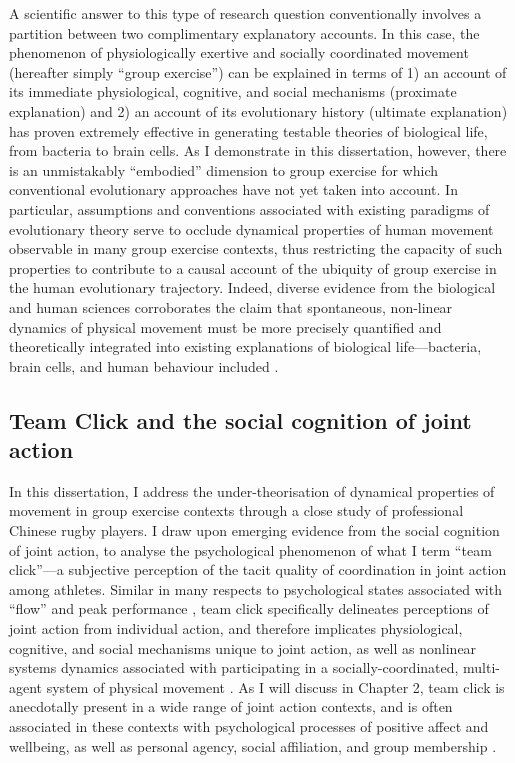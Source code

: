 A scientific answer to this type of research question conventionally involves a partition between two complimentary explanatory accounts.  In this case, the phenomenon of physiologically exertive and socially coordinated movement (hereafter simply ``group exercise'') can be explained in terms of 1) an account of its immediate physiological, cognitive, and social mechanisms (proximate explanation) and 2) an account of its evolutionary history (ultimate explanation) has proven extremely effective in generating testable theories of biological life, from bacteria to brain cells.
As I demonstrate in this dissertation, however, there is an unmistakably ``embodied'' dimension to group exercise for which conventional evolutionary approaches have not yet taken into account. In particular, assumptions and conventions associated with existing paradigms of evolutionary theory serve to occlude dynamical properties of human movement observable in many group exercise contexts, thus restricting the capacity of such properties to contribute to a causal account of the ubiquity of group exercise in the human evolutionary trajectory.  Indeed, diverse evidence from the biological and human sciences corroborates the claim that spontaneous, non-linear dynamics of physical movement must be more precisely quantified and theoretically integrated into existing explanations of biological life---bacteria, brain cells, and human behaviour included \citep{Nowak2006,Kelso2016,Laland2011,Laland2015,Yufik2017a,Nowak2017}.

\subsection{Team Click and the social cognition of joint action}
In this dissertation, I address the under-theorisation of dynamical properties of movement in group exercise contexts through a close study of professional Chinese rugby players.  I draw upon emerging evidence from the social cognition of joint action, to analyse the psychological phenomenon of what I term ``team click''---a subjective perception of the tacit quality of coordination in joint action among athletes.  Similar in many respects to psychological states associated with ``flow'' and peak performance \citep{Csikszentmihalyi1992}, team click specifically delineates perceptions of joint action from individual action, and therefore implicates physiological, cognitive, and social mechanisms unique to joint action, as well as nonlinear systems dynamics associated with participating in a socially-coordinated, multi-agent system of physical movement \citep{Kelso2009}. As I will discuss in Chapter 2, team click is anecdotally present in a wide range of joint action contexts, and is often associated in these contexts with psychological processes of positive affect and wellbeing, as well as personal agency, social affiliation, and group membership \citep{Jackson1995,Marsh2009,Wheatley2012,Slingerland2014}.

